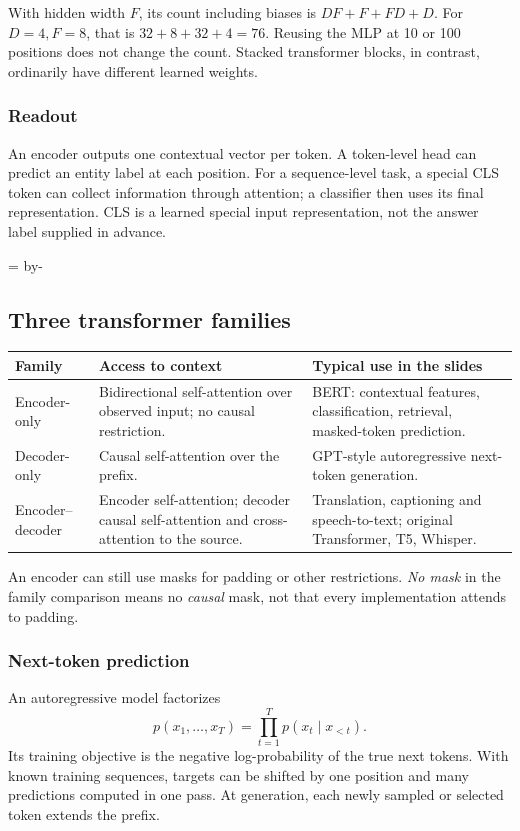 \documentclass[11pt]{article}
\newcommand{\newsubsection}[1]{\par\begingroup\skip0=\pagegoal\advance\skip0 by-\pagetotal\ifdim\skip0<12\baselineskip\newpage\fi\endgroup\subsection{#1}}
\begin{document}
With hidden width $F$, its count including biases is $DF+F+FD+D$. For $D=4,F=8$, that is $32+8+32+4=76$. Reusing the MLP at 10 or 100 positions does not change the count. Stacked transformer blocks, in contrast, ordinarily have different learned weights.

\subsubsection{Readout}
An encoder outputs one contextual vector per token. A token-level head can predict an entity label at each position. For a sequence-level task, a special CLS token can collect information through attention; a classifier then uses its final representation. CLS is a learned special input representation, not the answer label supplied in advance.

\newsubsection{Three transformer families}
\begin{longtable}{@{}P{.20\textwidth}P{.33\textwidth}P{.37\textwidth}@{}}
\toprule Family & Access to context & Typical use in the slides\\\midrule\endhead
Encoder-only & Bidirectional self-attention over observed input; no causal restriction. & BERT: contextual features, classification, retrieval, masked-token prediction.\\
Decoder-only & Causal self-attention over the prefix. & GPT-style autoregressive next-token generation.\\
Encoder--decoder & Encoder self-attention; decoder causal self-attention and cross-attention to the source. & Translation, captioning and speech-to-text; original Transformer, T5, Whisper.\\\bottomrule
\end{longtable}
An encoder can still use masks for padding or other restrictions. \emph{No mask} in the family comparison means no \emph{causal} mask, not that every implementation attends to padding.

\subsubsection{Next-token prediction}
An autoregressive model factorizes
\[
p(x_1,\ldots,x_T)=\prod_{t=1}^{T}p(x_t\mid x_{<t}).
\]
Its training objective is the negative log-probability of the true next tokens. With known training sequences, targets can be shifted by one position and many predictions computed in one pass. At generation, each newly sampled or selected token extends the prefix.
\end{document}
